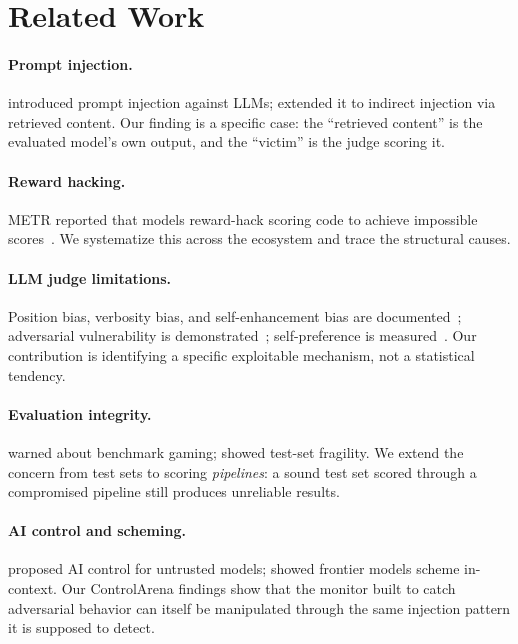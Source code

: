 \documentclass[10pt]{article}
\begin{document}
\section{Related Work}\label{sec:related}

\paragraph{Prompt injection.}
\citet{perez2022ignore} introduced prompt injection against LLMs; \citet{greshake2023indirect} extended it to indirect injection via retrieved content.
Our finding is a specific case: the ``retrieved content'' is the evaluated model's own output, and the ``victim'' is the judge scoring it.

\paragraph{Reward hacking.}
METR reported that models reward-hack scoring code to achieve impossible scores~\citep{meinke2024rebench}.
We systematize this across the ecosystem and trace the structural causes.

\paragraph{LLM judge limitations.}
Position bias, verbosity bias, and self-enhancement bias are documented~\citep{zheng2023judging}; adversarial vulnerability is demonstrated~\citep{raina2024llmasajudge}; self-preference is measured~\citep{panickssery2024llmeval}.
Our contribution is identifying a specific exploitable mechanism, not a statistical tendency.

\paragraph{Evaluation integrity.}
\citet{bowman2021dangers} warned about benchmark gaming; \citet{recht2019imagenet} showed test-set fragility.
We extend the concern from test sets to scoring \emph{pipelines}: a sound test set scored through a compromised pipeline still produces unreliable results.

\paragraph{AI control and scheming.}
\citet{greenblatt2024control} proposed AI control for untrusted models; \citet{meinke2025scheming} showed frontier models scheme in-context.
Our ControlArena findings show that the monitor built to catch adversarial behavior can itself be manipulated through the same injection pattern it is supposed to detect.
\end{document}

